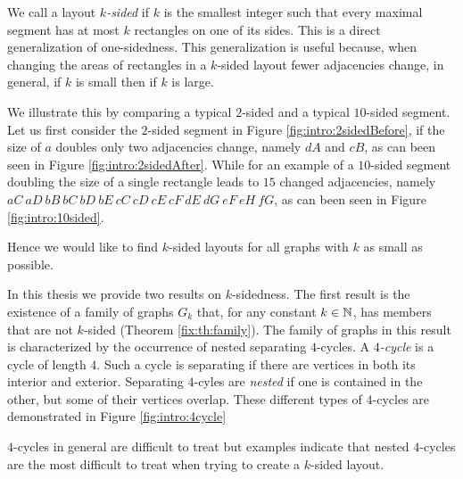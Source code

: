   We call a layout \emph{$k$-sided} if $k$ is the smallest integer such that every maximal segment has at most $k$ rectangles on one of its sides. This is a direct generalization of one-sidedness.
  This generalization is useful because, when changing the areas of rectangles in a $k$-sided layout fewer adjacencies change, in general, if $k$ is small then if $k$ is large.

  We illustrate this by comparing a typical $2$-sided and a typical $10$-sided segment.
  Let us first consider the $2$-sided segment in Figure \ref{fig:intro:2sidedBefore}, if the size of $a$ doubles only two adjacencies change, namely $dA$ and $cB$, as can been seen in Figure \ref{fig:intro:2sidedAfter}.
  While for an example of a $10$-sided segment doubling the size of a single rectangle leads to $15$ changed adjacencies, namely $aC\ aD\ bB\ bC\ bD\ bE\ cC\ cD\ cE\ cF\ dE\ dG\ eF\ eH\ fG$, as can been seen in Figure \ref{fig:intro:10sided}.

  Hence we would like to find $k$-sided layouts for all graphs with $k$ as small as possible.


  In this thesis we provide two results on $k$-sidedness. The first result is the existence of a family of graphs $G_k$ that, for any constant $k \in \mathbb{N}$, has members that are not $k$-sided (Theorem \ref{fix:th:family}). The family of graphs in this result is characterized by the occurrence of nested separating $4$-cycles.
  A \emph{$4$-cycle} is a cycle of length $4$.
  Such a cycle is separating if there are vertices in both its interior and exterior.
  Separating $4$-cyles are \emph{nested} if one is contained in the other, but some of their vertices overlap. These different types of $4$-cycles are demonstrated in Figure \ref{fig:intro:4cycle}

  $4$-cycles in general are difficult to treat but examples indicate that nested $4$-cycles are the most difficult to treat when trying to create a $k$-sided layout.



